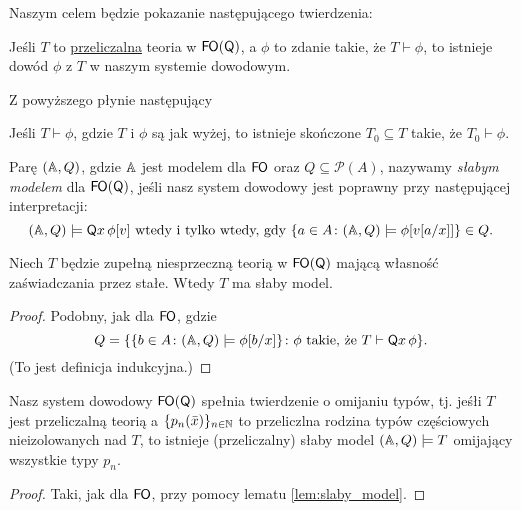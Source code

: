 \documentclass{article}
\begin{document}
Naszym celem będzie pokazanie następującego twierdzenia:
\begin{tw}
	Jeśli $T$ to \underline{przeliczalna} teoria w $\mathsf{F \mkern-1.4mu O}(\mathsf{Q})$, a $\phi$ to zdanie takie, że $T \vdash \phi$,
	to istnieje dowód $\phi$ z $T$ w naszym systemie dowodowym.
\end{tw}
Z powyższego płynie następujący
\begin{wn}
	 Jeśli $T \vdash \phi$, gdzie $T$ i $\phi$ są jak wyżej, to istnieje skończone $T_0 \subseteq T$ takie, że $T_0 \vdash \phi$.
\end{wn}

\begin{df}
	Parę $(\mathbb{A}, Q)$, gdzie $\mathbb{A}$ jest modelem dla $\mathsf{F \mkern-1.4mu O}$ oraz $Q \subseteq \mathcal{P}(A)$, nazywamy \textit{słabym modelem} dla $\mathsf{F \mkern-1.4mu O}(\mathsf{Q})$,
	jeśli nasz system dowodowy jest poprawny przy następującej interpretacji:
	\[
		(\mathbb{A}, Q) \models \mathsf{Q} x \, \phi[v] \text{ wtedy i tylko wtedy, gdy } \{a \in A \colon (\mathbb{A}, Q) \models \phi[v[a/x]]\} \in Q.
	\]

\end{df}

\begin{lem}
\label{lem:slaby_model}
	Niech $T$ będzie zupełną niesprzeczną teorią w $\mathsf{F \mkern-1.4mu O}(\mathsf{Q})$ mającą własność zaświadczania przez stałe.
	Wtedy $T$ ma słaby model.
\end{lem}
\begin{proof}
	 Podobny, jak dla $\mathsf{F \mkern-1.4mu O}$, gdzie
	 \[
		 Q = \{\{ b \in A \colon (\mathbb{A}, Q) \models \phi[b/x]\} \colon \phi \text{ takie, że } T \vdash \mathsf{Q} x \, \phi \}.
	 \]
	 (To jest definicja indukcyjna.)
\end{proof}

\begin{lem}
	Nasz system dowodowy $\mathsf{F \mkern-1.4mu O}(\mathsf{Q})$ spełnia twierdzenie o omijaniu typów,
	tj. jeśłi $T$ jest przeliczalną teorią a $\{p_n(\bar{x})\}_{n \in \mathbb{N}}$ to przeliczlna rodzina typów częściowych nieizolowanych nad $T$,
	to istnieje (przeliczalny) słaby model $(\mathbb{A}, Q) \models T$ omijający wszystkie typy $p_n$.
\end{lem}
\begin{proof}
	Taki, jak dla $\mathsf{F \mkern-1.4mu O}$, przy pomocy lematu \ref{lem:slaby_model}.
\end{proof}
\end{document}
